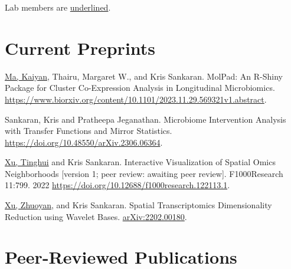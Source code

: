 \documentclass[letterpaper]{article}
\renewenvironment{itemize}{
  \begin{list}{}{
    \setlength{\leftmargin}{1.5em}
  }
}{
  \end{list}
}
\begin{document}
\pagebreak
Lab members are \underline{underlined}.
\section*{Current Preprints}

\begin{itemize}
\item \underline{Ma, Kaiyan}, {Thairu, Margaret W.}, and Kris Sankaran. MolPad:
An R-Shiny Package for Cluster Co-Expression Analysis in Longitudinal
Microbiomics.
\href{https://www.biorxiv.org/content/10.1101/2023.11.29.569321v1.abstract}{https://www.biorxiv.org/content/10.1101/2023.11.29.569321v1.abstract}.
\item Sankaran, Kris and Pratheepa Jeganathan. Microbiome Intervention Analysis
with Transfer Functions and Mirror Statistics.
\href{https://doi.org/10.48550/arXiv.2306.06364}{https://doi.org/10.48550/arXiv.2306.06364}.
\item \underline{Xu, Tinghui} and Kris Sankaran. Interactive Visualization of
Spatial Omics Neighborhoods [version 1; peer review: awaiting peer review]. F1000Research 11:799. 2022
\href{https://doi.org/10.12688/f1000research.122113.1}{https://doi.org/10.12688/f1000research.122113.1}.
\item \underline{Xu, Zhuoyan}, and Kris Sankaran. Spatial Transcriptomics
Dimensionality Reduction using Wavelet Bases. \href{https://arxiv.org/abs/2202.00180}{arXiv:2202.00180}.
\end{itemize}

\section*{Peer-Reviewed Publications}
\end{document}
